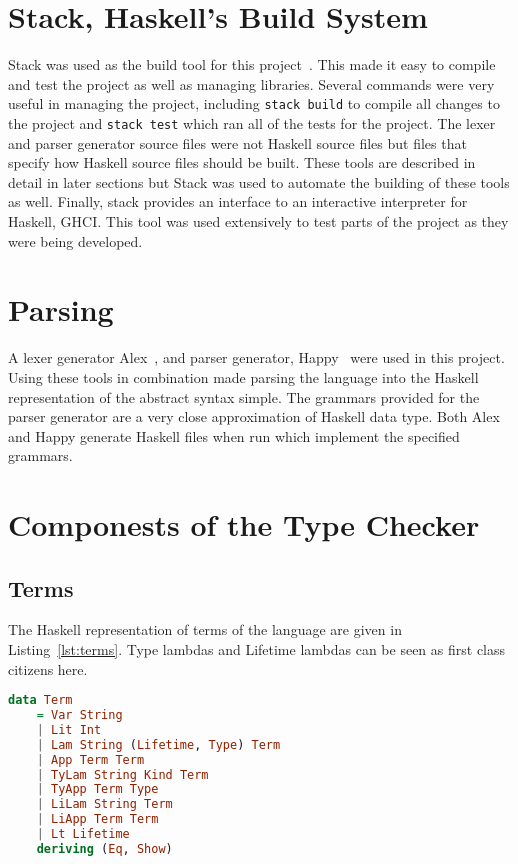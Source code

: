 \section{Stack, Haskell's Build System}
Stack was used as the build tool for this project~\cite{stack}. This made it
easy to compile and test the project as well as managing libraries. Several
commands were very useful in managing the project, including \lstinline{stack build}
to compile all changes to the project and \lstinline{stack test} which
ran all of the tests for the project. The lexer and parser generator source
files were not Haskell source files but files that specify how Haskell source
files should be built. These tools are described in detail in later sections
but Stack was used to automate the building of these tools as well. Finally,
stack provides an interface to an interactive interpreter for Haskell, GHCI.
This tool was used extensively to test parts of the project as they were being
developed.

\section{Parsing}
A lexer generator Alex~\cite{alex}, and parser generator, Happy~\cite{happy}
were used in this project. Using these tools in combination made parsing the
language into the Haskell representation of the abstract syntax simple.  The
grammars provided for the parser generator are a very close approximation of
Haskell data type. Both Alex and Happy generate Haskell files when run which
implement the specified grammars.


\section{Componests of the Type Checker}
\subsection{Terms}
The Haskell representation of terms of the language are given in
Listing~\ref{lst:terms}.  Type lambdas and Lifetime lambdas can be seen as
first class citizens here.

\begin{lstlisting}[caption=Haskell representation of Terms., language=Haskell, label={lst:terms}]
data Term
    = Var String
    | Lit Int
    | Lam String (Lifetime, Type) Term
    | App Term Term
    | TyLam String Kind Term 
    | TyApp Term Type
    | LiLam String Term
    | LiApp Term Term
    | Lt Lifetime
    deriving (Eq, Show)
\end{lstlisting}

